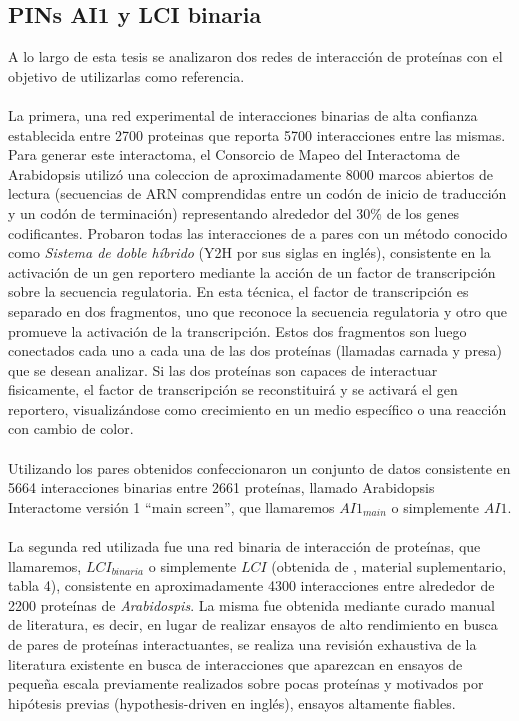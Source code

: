 \subsection{PINs AI1 y LCI binaria}
A lo largo de esta tesis se analizaron dos redes de interacción de proteínas con el objetivo de utilizarlas como referencia.\\\\
La primera, una red experimental de interacciones binarias de alta confianza establecida entre 2700 proteinas \cite{Hahn2013} que reporta 5700 interacciones entre las mismas. Para generar este interactoma, el Consorcio de Mapeo del Interactoma de Arabidopsis utilizó una coleccion de aproximadamente 8000 marcos abiertos de lectura (secuencias de ARN comprendidas entre un codón de inicio de traducción y un codón de terminación) representando alrededor del 30\% de los genes codificantes. Probaron todas las interacciones de a pares con un método conocido como \textit{Sistema de doble híbrido} (Y2H por sus siglas en inglés), consistente en la activación de un gen reportero mediante la acción de un factor de transcripción sobre la secuencia regulatoria. En esta técnica, el factor de transcripción es separado en dos fragmentos, uno que reconoce la secuencia regulatoria y otro que promueve la activación de la transcripción. Estos dos fragmentos son luego conectados cada uno a cada una de las dos proteínas (llamadas carnada y presa) que se desean analizar. Si las dos proteínas son capaces de interactuar fisicamente, el factor de transcripción se reconstituirá y se activará el gen reportero, visualizándose como crecimiento en un medio específico o una reacción con cambio de color.\cite{Bruckner2009}\\\\
Utilizando los pares obtenidos confeccionaron un conjunto de datos consistente en 5664 interacciones binarias entre 2661 proteínas, llamado Arabidopsis Interactome versión 1 ``main screen'', que llamaremos $AI1_{main}$ o simplemente $AI1$.\\\\
La segunda red utilizada fue una red binaria de interacción de proteínas, que llamaremos, $LCI_{binaria}$ o simplemente $LCI$ (obtenida de \cite{Hahn2013}, material suplementario, tabla 4), consistente en aproximadamente 4300 interacciones entre alrededor de 2200 proteínas de \textit{Arabidospis}. La misma fue obtenida mediante curado manual de literatura, es decir, en lugar de realizar ensayos de alto rendimiento en busca de pares de proteínas interactuantes, se realiza una revisión exhaustiva de la literatura existente en busca de interacciones que aparezcan en ensayos de pequeña escala previamente realizados sobre pocas proteínas y motivados por hipótesis previas (hypothesis-driven en inglés), ensayos altamente fiables.\cite{Cusick2009}\\\\
